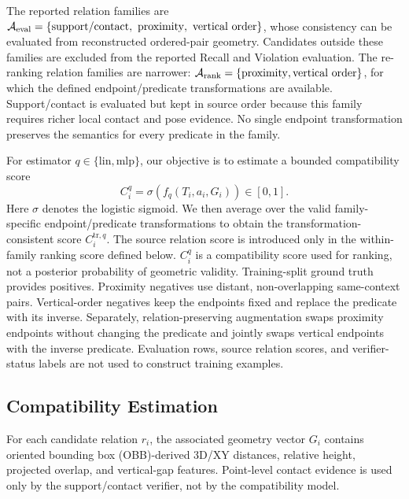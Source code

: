 The reported relation families are 
$\mathcal{A}_{\rm eval}=\{\mathrm{support/contact},\ \mathrm{proximity},\ \mathrm{vertical\ order}\}$, 
whose consistency can be evaluated from reconstructed ordered-pair geometry. Candidates outside these families are excluded from the reported Recall and Violation evaluation. The re-ranking relation families are narrower: $\mathcal A_{\rm rank}=\{\mathrm{proximity},\mathrm{vertical\ order}\}$, for which the defined endpoint/predicate transformations are available. Support/contact is evaluated but kept in source order because this family requires richer local contact and pose evidence. No single endpoint transformation preserves the semantics for every predicate in the family. 

For estimator $q\in\{\mathrm{lin},\mathrm{mlp}\}$, our objective is to estimate a bounded compatibility score
\begin{equation}
C_i^q=\sigma\!\left(f_q(T_i,a_i,G_i)\right)\in[0,1].
\end{equation}
Here $\sigma$ denotes the logistic sigmoid. We then average over the valid family-specific endpoint/predicate transformations to obtain the transformation-consistent score $C_i^{\mathrm{tr},q}$. The source relation score is introduced only in the within-family ranking score defined below. $C_i^q$ is a compatibility score used for ranking, not a posterior probability of geometric validity. Training-split ground truth provides positives. Proximity negatives use distant, non-overlapping same-context pairs. Vertical-order negatives keep the endpoints fixed and replace the predicate with its inverse. Separately, relation-preserving augmentation swaps proximity endpoints without changing the predicate and jointly swaps vertical endpoints with the inverse predicate. Evaluation rows, source relation scores, and verifier-status labels are not used to construct training examples.

\subsection{Compatibility Estimation}
\label{sec:Compatibility}
For each candidate relation $r_i$, the associated geometry vector $G_i$ contains oriented bounding box (OBB)-derived 3D/XY distances, relative height, projected overlap, and vertical-gap features. Point-level contact evidence is used only by the support/contact verifier, not by the compatibility model. 

